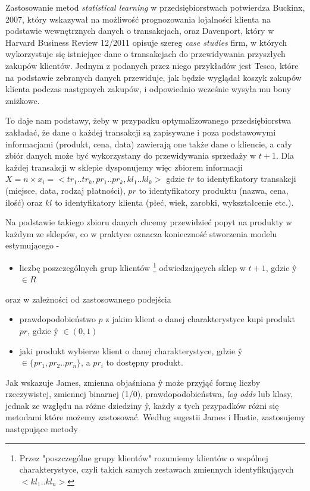 \documentclass{article}
\begin{document}
Zastosowanie metod \textit{statistical learning} w przedsiębiorstwach potwierdza Buckinx, 2007, który wskazywał na możliwość prognozowania lojalności klienta na podstawie wewnętrznych danych o transakcjach, oraz Davenport, który w Harvard Business Review 12/2011 opisuje szereg  \textit{case studies} firm, w których wykorzystuje się istniejące dane o transakcjach do przewidywania przyszłych zakupów klientów. Jednym z podanych przez niego przykładów jest Tesco, które na podstawie zebranych danych przewiduje, jak będzie wyglądał koszyk zakupów klienta podczas następnych zakupów, i odpowiednio wcześnie wysyła mu bony zniżkowe. 

To daje nam podstawy, żeby w przypadku optymalizowanego przedsiębiorstwa zakładać, że dane o każdej transakcji są zapisywane i poza podstawowymi informacjami (produkt, cena, data) zawierają one także dane o kliencie, a cały zbiór danych może być wykorzystany do przewidywania sprzedaży w $t + 1$. Dla każdej transakcji w sklepie dysponujemy więc zbiorem informacji $ X = n \times x_i = <tr_1..tr_k, pr_1.. pr_k,kl_1..kl_k>$ gdzie $tr$ to identyfikatory transakcji (miejsce, data, rodzaj płatności), $pr$ to identyfikatory produktu (nazwa, cena, ilość) oraz $kl$ to identyfikatory klienta (płeć, wiek, zarobki, wykształcenie etc.). 

Na podstawie takiego zbioru danych chcemy przewidzieć popyt na produkty w każdym ze sklepów, co w praktyce oznacza konieczność stworzenia modelu estymującego - 

	\begin{itemize} 
		\item liczbę poszczególnych grup klientów \footnote{Przez "poszczególne grupy klientów" rozumiemy klientów o wspólnej charakterystyce, czyli takich samych zestawach zmiennych identyfikujących $<kl_1..kl_n>$} odwiedzających sklep w $t+1$, gdzie \^{y} $\in R$ 
	\end{itemize}
	oraz w zależności od zastosowanego podejścia
	\begin{itemize} 
		\item prawdopodobieństwo $p$ z jakim klient o danej charakterystyce kupi produkt $pr$, gdzie \^{y} $\in (0,1)$  
		\item jaki produkt wybierze klient o danej charakterystyce, gdzie \^{y} $\in \{pr_1,pr_2..pr_n\}$, a $pr_i$ to dostępny produkt.
	\end{itemize}

Jak wskazuje James, zmienna objaśniana \^{y} może przyjąć formę liczby rzeczywistej, zmiennej binarnej (1/0), prawdopodobieństwa, \textit{log odds} lub klasy, jednak ze względu na różne dziedziny \^{y}, każdy z tych przypadków różni się metodami które możemy zastosować. Według sugestii James i Hastie, zastosujemy następujące metody
\end{document}
